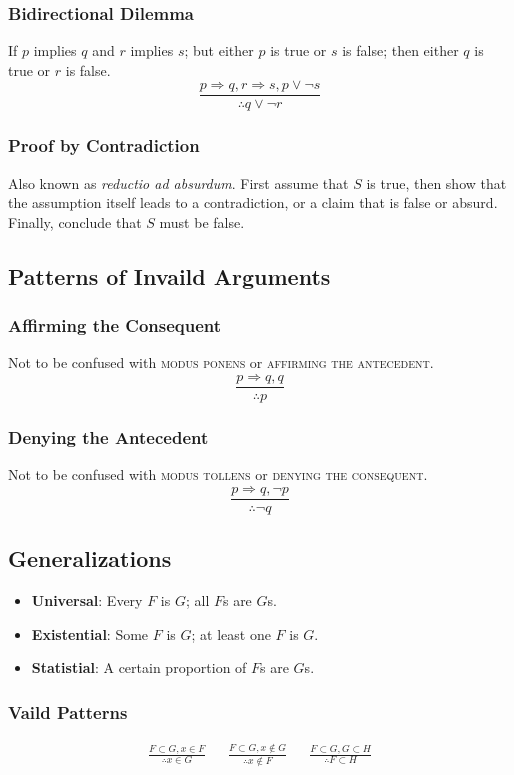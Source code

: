 \documentclass{article}
\begin{document}
\subsubsection{Bidirectional Dilemma}
If $p$ implies $q$ and $r$ implies $s$; but either $p$ is true or $s$ is false; then either $q$ is true or $r$ is false.
$$ \frac{p \Rightarrow q, r \Rightarrow s, p \lor \neg s}{\therefore q \lor \neg r} $$

\subsubsection{Proof by Contradiction}
Also known as \emph{reductio ad absurdum}. First assume that $S$ is true, then show that the assumption itself leads to a contradiction, or a claim that is false or absurd. Finally, conclude that $S$ must be false.

\subsection{Patterns of Invaild Arguments}

\subsubsection{Affirming the Consequent}
Not to be confused with \textsc{modus ponens} or \textsc{affirming the antecedent}.
$$ \frac{p \Rightarrow q, q}{\therefore p} $$

\subsubsection{Denying the Antecedent}
Not to be confused with \textsc{modus tollens} or \textsc{denying the consequent}.
$$ \frac{p \Rightarrow q, \neg p}{\therefore \neg q} $$

\subsection{Generalizations}
\begin{itemize}
  \item \textbf{Universal}: Every $F$ is $G$; all $F$s are $G$s.
  \item \textbf{Existential}: Some $F$ is $G$; at least one $F$ is $G$. 
  \item \textbf{Statistial}: A certain proportion of $F$s are $G$s.
\end{itemize}

\subsubsection{Vaild Patterns}
\begin{align*}
\frac{F \subset G, x \in F}{\therefore x \in G} &&
\frac{F \subset G, x \not\in G}{\therefore x \not\in F} &&
\frac{F \subset G, G \subset H}{\therefore F \subset H}
\end{align*}
\end{document}
